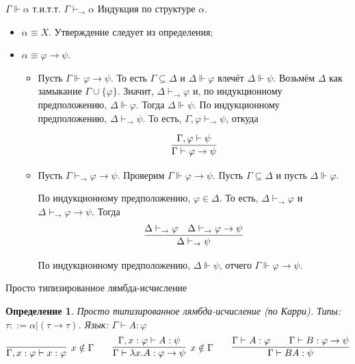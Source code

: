 \documentclass[aspectratio=169]{beamer}
\newtheorem{dfn}{Определение}[section]
\begin{document}
\begin{frame}{$\Gamma\Vdash \alpha$ т.и.т.т. $\Gamma\vdash_\rightarrow\alpha$}
Индукция по структуре $\alpha$.
\begin{itemize}
\item $\alpha \equiv X$. Утверждение следует из определения;
\item $\alpha \equiv \varphi\rightarrow\psi$. 
\begin{itemize}

\item Пусть $\Gamma\Vdash \varphi\rightarrow\psi$. То есть $\Gamma \subseteq \Delta$ и $\Delta \Vdash \varphi$
влечёт $\Delta \Vdash \psi$.
Возьмём $\Delta$ как замыкание $\Gamma\cup\{\varphi\}$. Значит, $\Delta\vdash_\rightarrow\varphi$
 и, по индукционному предположению, $\Delta\Vdash\varphi$.
Тогда $\Delta\Vdash\psi$. По индукционному предположению, $\Delta\vdash_\rightarrow\psi$. 
То есть, $\Gamma,\varphi\vdash_\rightarrow\psi$, откуда

$$\infer{\Gamma\vdash\varphi\rightarrow\psi}{\Gamma,\varphi\vdash\psi}$$
\item Пусть $\Gamma\vdash_\rightarrow\varphi\rightarrow\psi$. Проверим $\Gamma\Vdash\varphi\rightarrow\psi$.
Пусть $\Gamma \subseteq \Delta$ и пусть $\Delta\Vdash\varphi$. 

По индукционному предположению, $\varphi\in\Delta$.
То есть, $\Delta\vdash_\rightarrow\varphi$ и $\Delta\vdash_\rightarrow\varphi\rightarrow\psi$.
Тогда $$\infer{\Delta\vdash_\rightarrow\psi}{\Delta\vdash_\rightarrow\varphi\quad\Delta\vdash_\rightarrow\varphi\rightarrow\psi}$$

По индукционному предположению, $\Delta\Vdash\psi$, отчего $\Gamma\Vdash\varphi\rightarrow\psi$.
\end{itemize}
\end{itemize}
\end{frame}

\begin{frame}{Просто типизированное лямбда-исчисление}
\begin{dfn}
Просто типизированное лямбда-исчисление (по Карри). \pause Типы: $\tau ::= \alpha | (\tau\rightarrow\tau)$. \pause Язык: $\Gamma\vdash A:\varphi$
$$\infer[x \notin \Gamma]{\Gamma,x:\varphi \vdash x:\varphi}{} \quad\quad 
  \infer[x \notin \Gamma]{\Gamma\vdash \lambda x.A: \varphi\rightarrow\psi}{\Gamma,x:\varphi\vdash A:\psi} \quad\quad 
  \infer{\Gamma\vdash B A:\psi}{\Gamma\vdash A:\varphi\quad\quad\Gamma\vdash B:\varphi\rightarrow\psi}$$
\end{dfn}
\end{frame}
\end{document}
